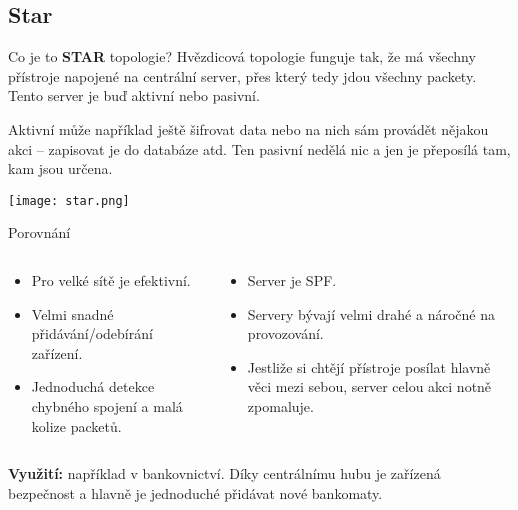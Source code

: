 \documentclass{beamer}
\begin{document}
\subsection{Star}
\label{sec:star}
\begin{frame}{Co je to \textbf{STAR} topologie?}
 Hvězdicová topologie funguje tak, že má všechny přístroje napojené na centrální
 server, přes který tedy jdou všechny packety. Tento server je buď aktivní nebo
 pasivní.

 Aktivní může například ještě šifrovat data nebo na nich sám provádět nějakou
 akci -- zapisovat je do databáze atd. Ten pasivní nedělá nic a jen je přeposílá
 tam, kam jsou určena.

 \texttt{[image: star.png]}
\end{frame}

\begin{frame}{Porovnání}

\begin{columns}
    \begin{column}{0.45\textwidth}
        \begin{itemize}
         \item Pro velké sítě je efektivní.
         \item Velmi snadné přidávání/odebírání zařízení.
         \item Jednoduchá detekce chybného spojení a malá kolize packetů.

        \end{itemize}
    \end{column}
    \begin{column}{0.45\textwidth}  %
        \begin{itemize}
            \item Server je SPF. 
            \item Servery bývají velmi drahé a náročné na provozování.
            \item Jestliže si chtějí přístroje posílat hlavně věci mezi sebou,
             server celou akci notně zpomaluje.

        \end{itemize}
    \end{column}
    \end{columns}
    \vspace{10pt}

\textbf{Využití:} například v bankovnictví. Díky centrálnímu hubu je zařízená
bezpečnost a hlavně je jednoduché přidávat nové bankomaty. 
\end{frame}
\end{document}

